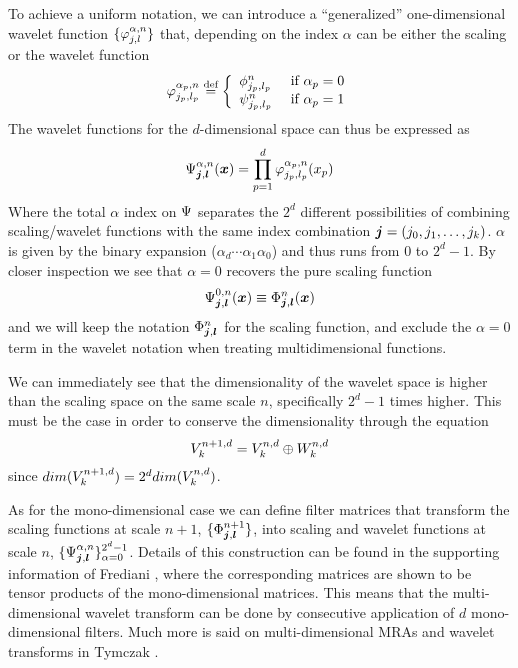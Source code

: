 To achieve a uniform notation, we can introduce a ``generalized'' one-dimensional
wavelet function $\lbrace\varphi_{j,l}^{\alpha,n}\rbrace$ that, depending on 
the index $\alpha$ can be either the scaling or the wavelet function
\begin{equation}
    \varphi^{\alpha_p,n}_{j_p,l_p} \stackrel{\text{def}}{\hbox{=}} 
    \left\{
	\begin{array}{lll}
	    \phi^n_{j_p,l_p}	&\mbox{ if }\alpha_p = 0\\
	    \psi^n_{j_p,l_p}	&\mbox{ if }\alpha_p = 1
	\end{array}
    \right.
\end{equation}
The wavelet functions for the $d$-dimensional space can thus be expressed as
\begin{equation}
    \Psi^{\alpha,n}_{\boldsymbol j, \boldsymbol l}(\boldsymbol x) =
    \prod_{p=1}^d\varphi^{\alpha_p,n}_{j_p,l_p}(x_p)
\end{equation}
Where the total $\alpha$ index on $\Psi$ separates the $2^d$ different
possibilities of combining scaling/wavelet functions with the same index
combination $\boldsymbol j = (j_0,j_1,\dots,j_k)$. $\alpha$ is given by the 
binary expansion ($\alpha_d\cdots\alpha_1\alpha_0$) and thus runs from $0$ 
to $2^d-1$. By closer inspection we see that $\alpha=0$ recovers the pure 
scaling function
\begin{equation}
    \Psi^{0,n}_{\boldsymbol j,\boldsymbol l}(\boldsymbol x) \equiv
    \Phi^n_{\boldsymbol j,\boldsymbol l}(\boldsymbol x)
\end{equation}
and we will keep the notation $\Phi^n_{\boldsymbol j,\boldsymbol l}$ for the
scaling function, and exclude the $\alpha=0$ term in the wavelet notation
when treating multidimensional functions.

We can immediately see that the dimensionality of the wavelet space is higher
than the scaling space on the same scale $n$, specifically $2^d-1$ times
higher. This must be the case in order to conserve the 
dimensionality through the equation
\begin{equation}
    {V}_{k}^{n+1,d} = {V}_{k}^{n,d} \oplus {W}_{k}^{n,d}
\end{equation}
since $dim({V}_{k}^{n+1,d}) = 2^d dim({V}_{k}^{n,d})$.

As for the mono-dimensional case we can define filter matrices that transform
the scaling functions at scale $n+1$, 
$\lbrace\Phi^{n+1}_{\boldsymbol j,\boldsymbol l}\rbrace$, 
into scaling and wavelet functions at scale $n$, 
$\lbrace\Psi^{\alpha,n}_{\boldsymbol j,\boldsymbol l}\rbrace_{\alpha=0}^{2^d-1}$. 
Details of this construction can be found in the supporting information of
Frediani \etal\cite{Frediani:2013p1143}, where the corresponding matrices are 
shown to be tensor products of the mono-dimensional matrices. This means that 
the multi-dimensional wavelet transform can be done by consecutive application 
of $d$ mono-dimensional filters. Much more is said on multi-dimensional MRAs
and wavelet transforms in Tymczak \etal\cite{Tymczak:2002}.

